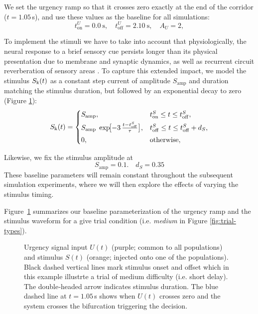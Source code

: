 \documentclass[../main.tex]{subfiles}
\begin{document}
We set the urgency ramp so that it crosses zero exactly at the end of the corridor ($t=1.05\,$s), and use these values as the baseline for all simulations:
\[
t_{\mathrm{on}}^U = 0.0\ \mathrm{s}, 
\quad
t_{\mathrm{off}}^U = 2.10\ \mathrm{s}, 
\quad
A_U = 2,
\]

To implement the stimuli we have to take into account that physiologically, the neural response to a brief sensory cue persists longer than its physical presentation due to membrane and synaptic dynamics, as well as recurrent circuit reverberation of sensory areas \cite{aubie2014}. To capture this extended impact, we model the stimulus \(S_{\mathrm{k}}(t)\) as a constant step current of amplitude \(S_{\mathrm{amp}}\) and duration matching the stimulus duration, but followed by an exponential decay to zero (Figure \ref{fig:input-parameters}):
\[
S_{\mathrm{k}}(t) = 
\begin{cases}
S_{\mathrm{amp}}, 
& t_{\mathrm{on}}^S \le t \le t_{\mathrm{off}}^S,\\[3pt]
S_{\mathrm{amp}}\;\exp\!\bigl[-3\,\tfrac{t - t_{\mathrm{off}}^S}{\tau}\bigr], 
& t_{\mathrm{off}}^S \le t \le t_{\mathrm{off}}^S + d_S,\\[3pt]
0, & \text{otherwise},
\end{cases}
\]


Likewise, we fix the stimulus amplitude at 
\[
S_{\mathrm{amp}} = 0.1. 
\quad
d_S = 0.35
\]
These baseline parameters will remain constant throughout the subsequent simulation experiments, where we will then explore the effects of varying the stimulus timing.


Figure~\ref{fig:input-parameters} summarizes our baseline parameterization of the urgency ramp and the stimulus waveform for a give trial condition (i.e. \textit{medium} in Figure \ref{fig:trial-types}).
\smallskip

\tikzexternaldisable
\begin{figure}[H]
\centering

\caption{Urgency signal input $U(t)$ (purple; common to all populations) and stimulus $S(t)$ (orange; injected onto one of the populations). Black dashed vertical lines mark stimulus onset and offset which in this example illustrte a trial of medium difficulty (i.e. short delay). The double‐headed arrow indicates stimulus duration. The blue dashed line at $t=1.05\,$s shows when $U(t)$ crosses zero and the system crosses the bifurcation  triggering the decision.}
\label{fig:input-parameters}
\end{figure}
\tikzexternalenable
\end{document}

